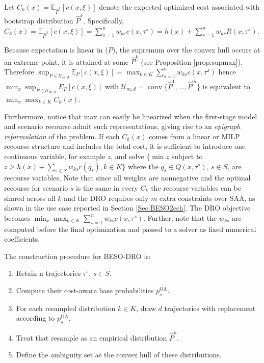 \documentclass[mnsc,sglanonrev]{informs4}  %
\theoremstyle{remark}\newtheorem{remark}{Remark}
\begin{document}
Let $ C_k(x) = \mathbb E_{\widehat P^k}[c(x,\xi)] $ denote the expected optimized cost associated with bootstrap distribution $\widehat P^k$. Specifically, \(C_k(x) =\mathbb E_{\widehat P^{\,k}}[c(x,\xi)] =\sum_{s=1}^{n}w_{ks}c(x,\tau^s) =h(x)+\sum_{s=1}^{n}w_{ks}R(x,\tau^s).\)

Because expectation is linear in ($P$), the supremum over the convex hull occurs at an extreme point, it is attained at some $\widehat P^k$ (see Proposition \ref{prop:supmax}). Therefore $\displaystyle \sup_{P\in\mathcal  U_{m,d}} \mathbb E_P[c(x,\xi)] = \max_{k\in K} \sum_{s=1}^{n} w_{ks} c(x,\tau^s) $
hence
$ \min_x\sup_{P\in\mathcal U_{m,d}}E_P[c(x,\xi)] $
with
$ \mathcal U_{m,d}= \operatorname{conv} \{\widehat P^1,\ldots,\widehat P^m\} $
is equivalent to $\displaystyle \min_x \max_{k\in K} C_k(x). $


Furthermore, notice that max can easily be linearized when the first-stage model and scenario recourse admit such representations, giving rise to an {\em epigraph reformulation} of the problem. If each \(C_k(x)\) comes from a linear or MILP recourse structure and includes the total cost, it is sufficient to introduce one continuous variable, for example $z$, and solve $\{\min z $ subject to $z \geq h(x) + \sum_{s\in S} w_{ks} r(q_s), k\in K\}$ where the $q_s \in Q(x, \tau^s)$, $s\in S$, are recourse variables. Note that since all weights are nonnegative and the optimal recourse for scenario $s$ is the same in every $C_k$ the recourse variables can be shared across all $k$ and the DRO requires only $m$ extra constraints over SAA, as shown in the use case reported in Section \ref{Sec:BESO2ech}.
The DRO objective becomes $\displaystyle  \min_x\max_{k\in K} \sum_{s=1}^{n} w_{ks}c(x,\tau^s)$. 
Further, note that the $w_{ks}$ are computed before the final optimization and passed to a solver as fixed numerical coefficients.

The construction procedure for BESO-DRO is:
\begin{enumerate}
  \item Retain n trajectories \(\tau^s\), \(s\in S\).
  \item Compute their cost-aware base probabilities \(p_s^{\mathrm{OA}}\).
  \item For each resampled distribution \(k\in K\), draw \(d\) trajectories with replacement according to \(p_s^{\mathrm{OA}}\).
  \item Treat that resample as an empirical distribution \(\widehat P^k\).
  \item Define the ambiguity set as the convex hull of these distributions.
\end{enumerate}
\end{document}
